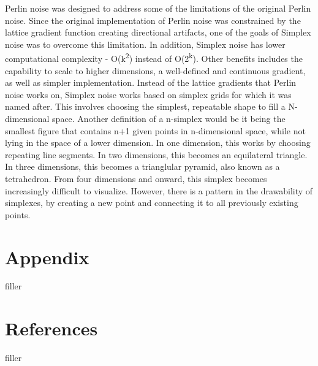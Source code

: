 \documentclass[10pt]{report}
\begin{document}
		Perlin noise was designed to address some of the limitations of the original Perlin noise. Since the original implementation of Perlin noise was constrained by the lattice gradient function creating directional artifacts, one of the goals of Simplex noise was to overcome this limitation. In addition, Simplex noise has lower computational complexity - O(k\textsuperscript{2}) instead of O(2\textsuperscript{k})\cite{sheet-simplex}. Other benefits includes the capability to scale to higher dimensions, a well-defined and continuous gradient, as well as simpler implementation. Instead of the lattice gradients that Perlin noise works on, Simplex noise works based on simplex grids for which it was named after. This involves choosing the simplest, repeatable shape to fill a N-dimensional space. Another definition of a n-simplex would be it being the smallest figure that contains n+1 given points in n-dimensional space, while not lying in the space of a lower dimension. In one dimension, this works by choosing repeating line segments. In two dimensions, this becomes an equilateral triangle. In three dimensions, this becomes a trianglular pyramid, also known as a tetrahedron. From four dimensions and onward, this simplex becomes increasingly difficult to visualize. However, there is a pattern in the drawability of simplexes, by creating a new point and connecting it to all previously existing points.
		
	\vspace{10pt}
	\let\clearpage\relax
	\chapter{Appendix}
		filler
		
	\vspace{10pt}
	\let\clearpage\relax
	\chapter{References}
		filler
	
		
\end{document}
